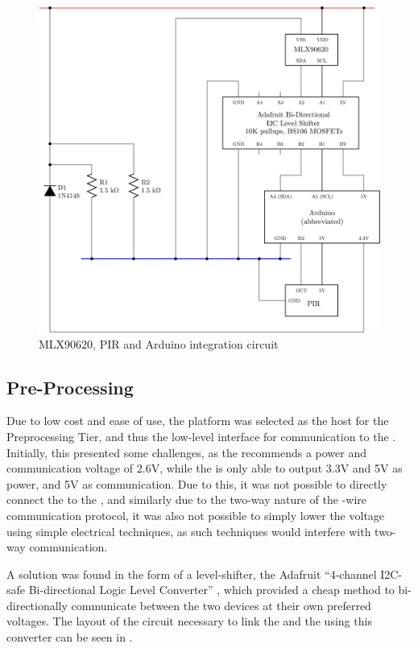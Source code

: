 \documentclass[../thesis/thesis.tex]{subfiles}
\begin{document}
\begin{figure}
\centering
\includegraphics[width=\textwidth]{../diagrams/mlx-arduino2.pdf}
\caption{MLX90620, PIR and Arduino integration circuit}
\label{fig:circuits:node}
\end{figure}

\subsection{Pre-Processing}

Due to low cost and ease of use, the \ard platform was selected as the host for the Preprocessing Tier, and thus the low-level \iic interface for communication to the \mlx. Initially, this presented some challenges, as the \mlx recommends a power and communication voltage of 2.6V, while the \ard is only able to output 3.3V and 5V as power, and 5V as communication. Due to this, it was not possible to directly connect the \ard to the \mlx, and similarly due to the two-way nature of the -wire communication protocol, it was also not possible to simply lower the \ard voltage using simple electrical techniques, as such techniques would interfere with two-way communication.

A solution was found in the form of a \iic level-shifter, the Adafruit ``4-channel I2C-safe Bi-directional Logic Level Converter'' \cite{AdafruitI2C}, which provided a cheap method to bi-directionally communicate between the two devices at their own preferred voltages. The layout of the circuit necessary to link the \ard and the \mlx using this converter can be seen in .
\end{document}

